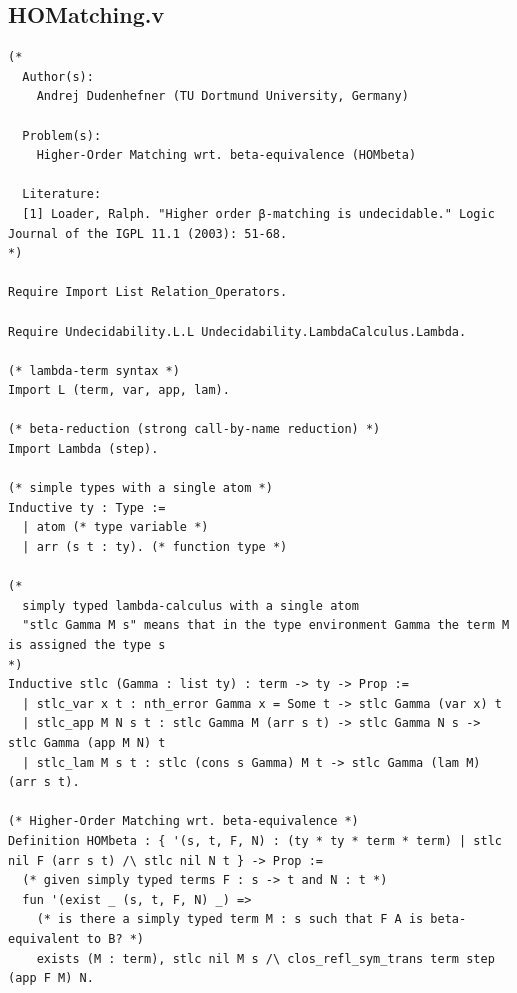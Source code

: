 \documentclass[10pt,a4paper]{amsart}
\begin{document}
\subsection*{HOMatching.v}
\begin{lstlisting}
(*
  Author(s):
    Andrej Dudenhefner (TU Dortmund University, Germany)

  Problem(s):
    Higher-Order Matching wrt. beta-equivalence (HOMbeta)

  Literature:
  [1] Loader, Ralph. "Higher order β-matching is undecidable." Logic Journal of the IGPL 11.1 (2003): 51-68.
*)

Require Import List Relation_Operators.

Require Undecidability.L.L Undecidability.LambdaCalculus.Lambda.

(* lambda-term syntax *)
Import L (term, var, app, lam).

(* beta-reduction (strong call-by-name reduction) *)
Import Lambda (step).

(* simple types with a single atom *)
Inductive ty : Type :=
  | atom (* type variable *)
  | arr (s t : ty). (* function type *)

(*
  simply typed lambda-calculus with a single atom
  "stlc Gamma M s" means that in the type environment Gamma the term M is assigned the type s
*)
Inductive stlc (Gamma : list ty) : term -> ty -> Prop :=
  | stlc_var x t : nth_error Gamma x = Some t -> stlc Gamma (var x) t
  | stlc_app M N s t : stlc Gamma M (arr s t) -> stlc Gamma N s -> stlc Gamma (app M N) t
  | stlc_lam M s t : stlc (cons s Gamma) M t -> stlc Gamma (lam M) (arr s t).

(* Higher-Order Matching wrt. beta-equivalence *)
Definition HOMbeta : { '(s, t, F, N) : (ty * ty * term * term) | stlc nil F (arr s t) /\ stlc nil N t } -> Prop :=
  (* given simply typed terms F : s -> t and N : t *)
  fun '(exist _ (s, t, F, N) _) =>
    (* is there a simply typed term M : s such that F A is beta-equivalent to B? *)
    exists (M : term), stlc nil M s /\ clos_refl_sym_trans term step (app F M) N.

\end{lstlisting}
\end{document}
